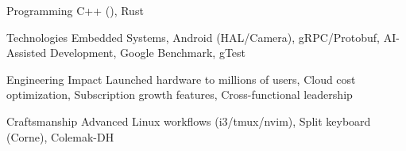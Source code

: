 


\begin{cvskills}


\cvskill
{Programming} %
{C++ (), Rust} %


\cvskill
{Technologies} %
{Embedded Systems, Android (HAL/Camera), gRPC/Protobuf, AI-Assisted Development, Google Benchmark, gTest} %




\cvskill
{Engineering Impact} %
{Launched hardware to millions of users, Cloud cost optimization, Subscription growth features, Cross-functional leadership} %


\cvskill
{Craftsmanship} %
{Advanced Linux workflows (i3/tmux/nvim), Split keyboard (Corne), Colemak-DH} %


\vspace{1mm}
\end{cvskills}
